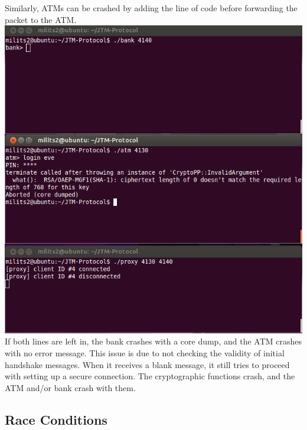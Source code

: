 \documentclass{article}
\begin{document}
Similarly, ATMs can be crashed by adding the line of code before forwarding the packet to the ATM.
\\
\includegraphics[scale=0.5]{crashATM.png}
\\
If both lines are left in, the bank crashes with a core dump, and the ATM crashes with no error message. This issue is due to not checking the validity of initial handshake messages. When it receives a blank message, it still tries to proceed with setting up a secure connection. The cryptographic functions crash, and the ATM and/or bank crash with them.

\subsection{Race Conditions}
\end{document}
